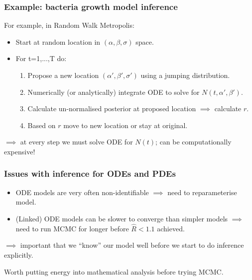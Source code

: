 \documentclass[handout]{beamer}
\begin{document}
\begin{frame}
	\frametitle{Example: bacteria growth model inference}
	
	 For example, in Random Walk Metropolis:
	
	\begin{itemize}
		\item<3-> Start at random location in $(\alpha,\beta,\sigma)$ space.
		\item<4-> For t=1,...,T do:
		\begin{enumerate}
			\item<5-> Propose a new location $(\alpha',\beta',\sigma')$ using a jumping distribution.
			\item<6-> Numerically (or analytically) integrate ODE to solve for $N(t,\alpha',\beta')$.
			\item<7-> Calculate un-normalised posterior at proposed location $\implies$ calculate $r$.
			\item<8-> Based on $r$ move to new location or stay at original.
		\end{enumerate}
	\end{itemize}
	
	$\implies$ at every step we must solve ODE for $N(t)$; can be computationally expensive!
	
\end{frame}

\begin{frame}
	\frametitle{Issues with inference for ODEs and PDEs}
	\begin{itemize}
		\item<2-> ODE models are very often non-identifiable $\implies$ need to reparameterise model.
		\item<3-> (Linked) ODE models can be slower to converge than simpler models $\implies$ need to run MCMC for longer before $\hat{R}<1.1$ achieved.
	\end{itemize}
	
	$\implies$ important that we ``know'' our model well before we start to do inference explicitly.
	
	 Worth putting energy into mathematical analysis before trying MCMC. 
	
\end{frame}
\end{document}
